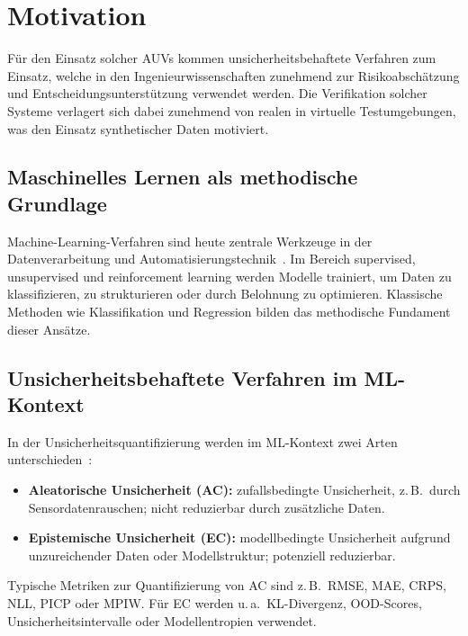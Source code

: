 
\chapter{Motivation}
\label{chapter:motivation}

Für den Einsatz solcher AUVs kommen unsicherheitsbehaftete Verfahren zum Einsatz, welche in den Ingenieurwissenschaften zunehmend zur Risikoabschätzung und Entscheidungsunterstützung verwendet werden. Die Verifikation solcher Systeme verlagert sich dabei zunehmend von realen in virtuelle Testumgebungen, was den Einsatz synthetischer Daten motiviert.

\section{Maschinelles Lernen als methodische Grundlage}

Machine-Learning-Verfahren sind heute zentrale Werkzeuge in der Datenverarbeitung und Automatisierungstechnik~\parencite{nof2023}. Im Bereich supervised, unsupervised und reinforcement learning werden Modelle trainiert, um Daten zu klassifizieren, zu strukturieren oder durch Belohnung zu optimieren. Klassische Methoden wie Klassifikation und Regression bilden das methodische Fundament dieser Ansätze.

\section{Unsicherheitsbehaftete Verfahren im ML-Kontext}

In der Unsicherheitsquantifizierung werden im ML-Kontext zwei Arten unterschieden~\parencite{Hullermeier2021}:

\begin{itemize}
  \item \textbf{Aleatorische Unsicherheit (AC):} zufallsbedingte Unsicherheit, z.\,B.\ durch Sensordatenrauschen; nicht reduzierbar durch zusätzliche Daten.
  \item \textbf{Epistemische Unsicherheit (EC):} modellbedingte Unsicherheit aufgrund unzureichender Daten oder Modellstruktur; potenziell reduzierbar.
\end{itemize}

\noindent
Typische Metriken zur Quantifizierung von AC sind z.\,B.\ RMSE, MAE, CRPS, NLL, PICP oder MPIW. Für EC werden u.\,a.\ KL-Divergenz, OOD-Scores, Unsicherheitsintervalle oder Modellentropien verwendet.

